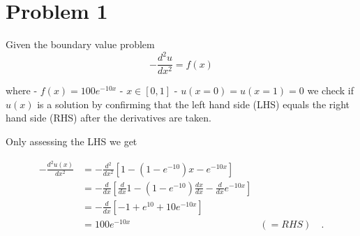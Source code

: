 \documentclass[final, 3p, times, 11.5pt]{article}
\begin{document}
\section*{Problem 1}

Given the boundary value problem 
\begin{equation}
\label{eq:bvp}
- \frac{d^{2}{u}}{d{x^{2}}} = f(x)
\end{equation}

where 
- $f(x) = 100e^{-10x}$
- $x\in[0, 1]$
- $u(x=0)=u(x=1)= 0$
we check if $u(x)$ is a solution by confirming that the left hand side (LHS) equals the right hand side (RHS) after the derivatives are taken. 

Only assessing the LHS we get 

\begin{align*}
- \frac{d^{2}{u(x)}}{d{x^{2}}}  & =  
- \frac{d^{2}}{d{x^{2}}} \left[
1 - (1- e^{-10})x - e^{-10x}  
\right]  \\ 
& =  
- \frac{d}{d{x}}\left[
\frac{d}{d{x}} 1 -  (1-e^{-10})\frac{d{x}}{d{x}} - \frac{d{}}{d{x}}e^{-10x}
\right] \\
& = 
- \frac{d}{d{x}}\left[
-1 + e^{10} + 10e^{-10x}
\right] \\
&= 100 e^{-10x} &(= RHS) \quad .
\end{align*} 
\end{document}
